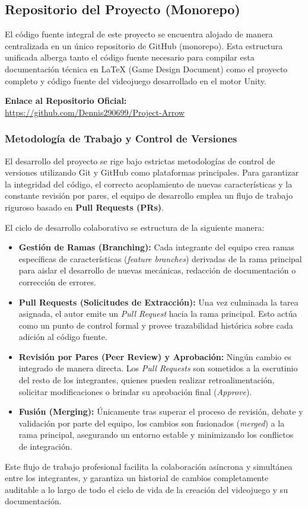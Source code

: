 \subsection{Repositorio del Proyecto (Monorepo)}

El código fuente integral de este proyecto se encuentra alojado de manera centralizada en un único repositorio de GitHub (monorepo). Esta estructura unificada alberga tanto el código fuente necesario para compilar esta documentación técnica en LaTeX (Game Design Document) como el proyecto completo y código fuente del videojuego desarrollado en el motor Unity.

\vspace{1em}

\noindent \textbf{Enlace al Repositorio Oficial:} \\
\url{https://github.com/Dennis290699/Project-Arrow}

\subsubsection*{Metodología de Trabajo y Control de Versiones}

El desarrollo del proyecto se rige bajo estrictas metodologías de control de versiones utilizando Git y GitHub como plataformas principales. Para garantizar la integridad del código, el correcto acoplamiento de nuevas características y la constante revisión por pares, el equipo de desarrollo emplea un flujo de trabajo riguroso basado en \textbf{Pull Requests (PRs)}.

El ciclo de desarrollo colaborativo se estructura de la siguiente manera:

\begin{itemize}
    \item \textbf{Gestión de Ramas (Branching):} Cada integrante del equipo crea ramas específicas de características (\textit{feature branches}) derivadas de la rama principal para aislar el desarrollo de nuevas mecánicas, redacción de documentación o corrección de errores.
    \item \textbf{Pull Requests (Solicitudes de Extracción):} Una vez culminada la tarea asignada, el autor emite un \textit{Pull Request} hacia la rama principal. Esto actúa como un punto de control formal y provee trazabilidad histórica sobre cada adición al código fuente.
    \item \textbf{Revisión por Pares (Peer Review) y Aprobación:} Ningún cambio es integrado de manera directa. Los \textit{Pull Requests} son sometidos a la escrutinio del resto de los integrantes, quienes pueden realizar retroalimentación, solicitar modificaciones o brindar su aprobación final (\textit{Approve}).
    \item \textbf{Fusión (Merging):} Únicamente tras superar el proceso de revisión, debate y validación por parte del equipo, los cambios son fusionados (\textit{merged}) a la rama principal, asegurando un entorno estable y minimizando los conflictos de integración.
\end{itemize}

Este flujo de trabajo profesional facilita la colaboración asíncrona y simultánea entre los integrantes, y garantiza un historial de cambios completamente auditable a lo largo de todo el ciclo de vida de la creación del videojuego y su documentación.
